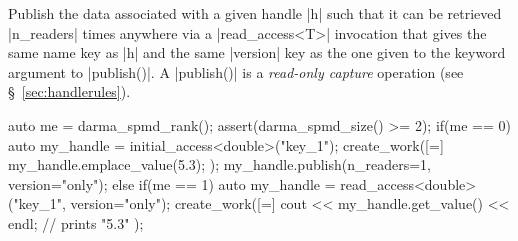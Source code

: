 Publish the data associated with a given handle |h| such that it can be
retrieved |n_readers| times anywhere via a |read_access<T>| invocation
that gives the same name key as |h| and the same |version| key as
the one given to the keyword argument to |publish()|.
A |publish()| is a {\it read-only capture} operation (see
\S~\ref{sec:handlerules}).

\begin{CppCodeNumb}
auto me = darma_spmd_rank();
assert(darma_spmd_size() >= 2);
if(me == 0) {
  auto my_handle = initial_access<double>("key_1");
  create_work([=]{
    my_handle.emplace_value(5.3);
  });
  my_handle.publish(n_readers=1, version="only");
}
else if(me == 1) {
  auto my_handle = read_access<double>("key_1", version="only");
  create_work([=]{
    cout << my_handle.get_value() << endl; // prints "5.3"
  });
}
\end{CppCodeNumb}


